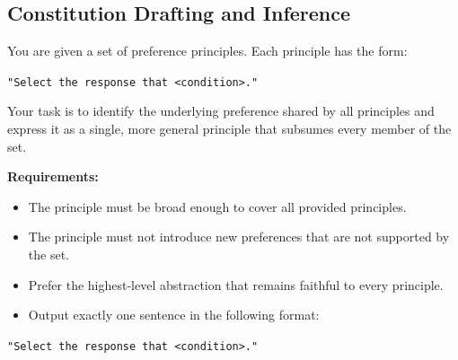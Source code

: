 \subsection{Constitution Drafting and Inference}

\begin{tcolorbox}[
  enhanced jigsaw,
  breakable,
  colback=blue!5!white,
  colframe=blue!75!black,
  title={Cluster Abstraction Prompt},
  rounded corners
]
\noindent
You are given a set of preference principles. Each principle has the form:

\vspace{0.5em}

\noindent
\texttt{"Select the response that \textless{}condition\textgreater{}."}

\vspace{0.5em}

\noindent
Your task is to identify the underlying preference shared by all principles and express it as a single, more general principle that subsumes every member of the set.

\vspace{1em}

\noindent
\textbf{Requirements:}

\begin{itemize}
    \item The principle must be broad enough to cover all provided principles.
    \item The principle must not introduce new preferences that are not supported by the set.
    \item Prefer the highest-level abstraction that remains faithful to every principle.
    \item Output exactly one sentence in the following format:
\end{itemize}

\vspace{0.5em}

\noindent
\texttt{"Select the response that \textless{}condition\textgreater{}."}
\end{tcolorbox}
\vspace{10pt}
\noindent\begin{minipage}{\textwidth}
\label{abstraction_prompt}
\end{minipage}

